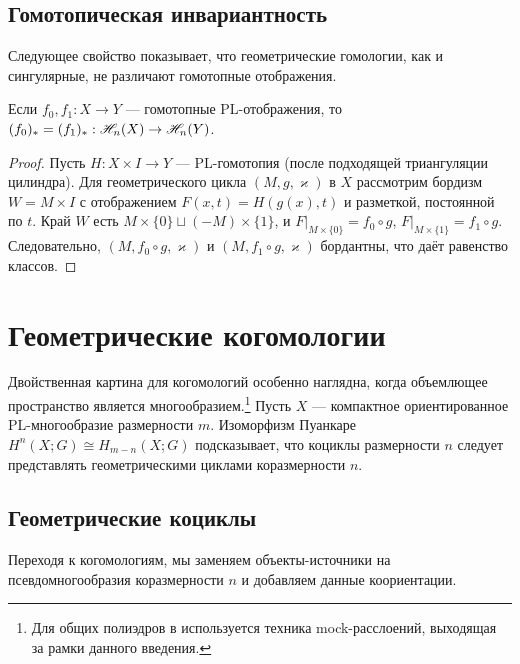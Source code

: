 \documentclass[12pt, twoside]{article}
\begin{document}
\subsection{Гомотопическая инвариантность}

Следующее свойство показывает, что геометрические гомологии, как и сингулярные, не различают гомотопные отображения.

\begin{theorem}\label{thm:homotopy}
Если $f_0, f_1 : X \to Y$ --- гомотопные PL-отображения, то $(f_0)_* = (f_1)_* : \mathscr{H}_n(X) \to \mathscr{H}_n(Y)$.
\end{theorem}
\begin{proof}
Пусть $H: X \times I \to Y$ --- PL-гомотопия (после подходящей триангуляции цилиндра). Для геометрического цикла $(M,g,\varkappa)$ в $X$ рассмотрим бордизм $W = M \times I$ с отображением $F(x,t) = H(g(x),t)$ и разметкой, постоянной по $t$. Край $W$ есть $M \times \{0\} \sqcup (-M) \times \{1\}$, и $F|_{M \times \{0\}} = f_0 \circ g$, $F|_{M \times \{1\}} = f_1 \circ g$. Следовательно, $(M, f_0 \circ g, \varkappa)$ и $(M, f_1 \circ g, \varkappa)$ бордантны, что даёт равенство классов.
\end{proof}

\section{Геометрические когомологии}

Двойственная картина для когомологий особенно наглядна, когда объемлющее пространство является многообразием.\footnote{Для общих полиэдров в \cite{BRS} используется техника mock-расслоений, выходящая за рамки данного введения.} Пусть $X$ --- компактное ориентированное PL-многообразие размерности $m$. Изоморфизм Пуанкаре $H^n(X;G) \cong H_{m-n}(X;G)$ подсказывает, что коциклы размерности $n$ следует представлять геометрическими циклами коразмерности $n$.

\subsection{Геометрические коциклы}

Переходя к когомологиям, мы заменяем объекты-источники на псевдомногообразия коразмерности $n$ и добавляем данные коориентации.
\end{document}
